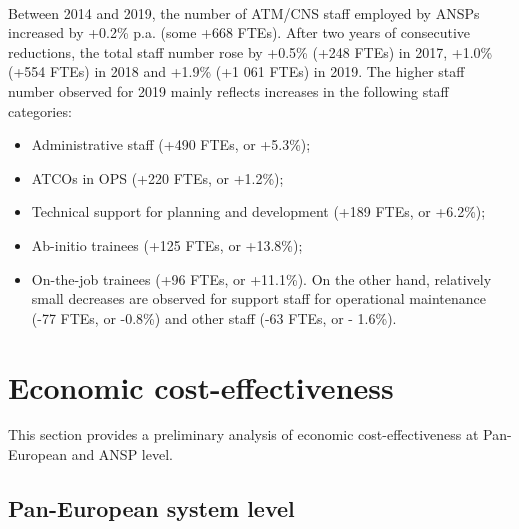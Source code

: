\documentclass[
]{book}
\providecommand{\tightlist}{%
  \setlength{\itemsep}{0pt}\setlength{\parskip}{0pt}}
\begin{document}
\begin{cols}
\begin{col}{0.55\textwidth}
\end{col}

\begin{col}{0.05\textwidth}
~

\end{col}

\begin{col}{0.4\textwidth}

Between 2014 and 2019, the number of ATM/CNS staff employed by ANSPs increased by +0.2\% p.a. (some +668 FTEs). After two years of consecutive reductions, the total staff number rose by +0.5\% (+248 FTEs) in 2017, +1.0\% (+554 FTEs) in 2018 and +1.9\% (+1 061 FTEs) in 2019. The higher staff number observed for 2019 mainly reflects increases in the following staff categories:

\begin{itemize}
\tightlist
\item
  Administrative staff (+490 FTEs, or +5.3\%);
\item
  ATCOs in OPS (+220 FTEs, or +1.2\%);
\item
  Technical support for planning and development (+189 FTEs, or +6.2\%);
\item
  Ab-initio trainees (+125 FTEs, or +13.8\%);
\item
  On-the-job trainees (+96 FTEs, or +11.1\%). On the other hand, relatively small decreases are observed for support staff for operational maintenance (-77 FTEs, or -0.8\%) and other staff (-63 FTEs, or - 1.6\%).
\end{itemize}

\end{col}

\end{cols}

\hypertarget{economic}{%
\chapter{Economic cost-effectiveness}\label{economic}}

This section provides a preliminary analysis of economic cost-effectiveness at Pan-European and ANSP level.

\hypertarget{pan-european-system-level}{%
\section{Pan-European system level}\label{pan-european-system-level}}
\end{document}
